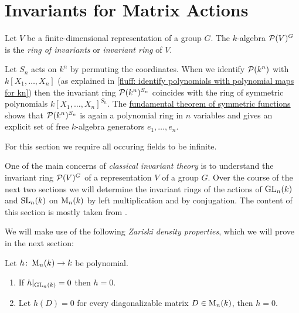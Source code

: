 \section{Invariants for Matrix Actions}


\begin{definition}
  Let $V$ be a finite-dimensional representation of a group $G$.
  The $k$-algebra $\mathcal{P}(V)^G$ is the \emph{ring of invariants} or \emph{invariant ring} of $V$.
\end{definition}


\begin{example}
  Let $S_n$ acts on $k^n$ by permuting the coordinates.
  When we identify $\mathcal{P}(k^n)$ with $k[X_1, \dotsc, X_n]$ (as explained in \ref{fluff: identify polynomials with polynomial maps for kn}) then the invariant ring $\mathcal{P}(k^n)^{S_n}$ coincides with the ring of symmetric polynomials $k[X_1, \dotsc, X_n]^{S_n}$.
  The \hyperref[theorem: fundamental theorem of symmetric functions]{fundamental theorem of symmetric functions} shows that $\mathcal{P}(k^n)^{S_n}$ is again a polynomial ring in $n$ variables and gives an explicit set of free $k$-algebra generators $e_1, \dotsc, e_n$.
\end{example}


\begin{conventions}
  For this section we require all occuring fields to be infinite.
\end{conventions}


\begin{fluff}
  One of the main concerns of \emph{classical invariant theory} is to understand the invariant ring $\mathcal{P}(V)^G$ of a representation $V$ of a group $G$.
  Over the course of the next two sections we will determine the invariant rings of the actions of $\operatorname{GL}_n(k)$ and $\operatorname{SL}_n(k)$ on $\operatorname{M}_n(k)$ by left multiplication and by conjugation.
  The content of this section is mostly taken from \cite[\S 1.2, \S 2.3]{InvariantPrimer}.
  
  We will make use of the following \emph{Zariski density properties}, which we will prove in the next section:
\end{fluff}


\begin{proposition}
  \label{proposition: zariski density properties}
  Let $h \colon \operatorname{M}_n(k) \to k$ be polynomial.
  \begin{enumerate}
    \item
      If $h|_{\operatorname{GL}_n(k)} = 0$ then $h = 0$.
    \item
      Let $h(D) = 0$ for every diagonalizable matrix $D \in \operatorname{M}_n(k)$, then $h = 0$.
  \end{enumerate}
\end{proposition}


